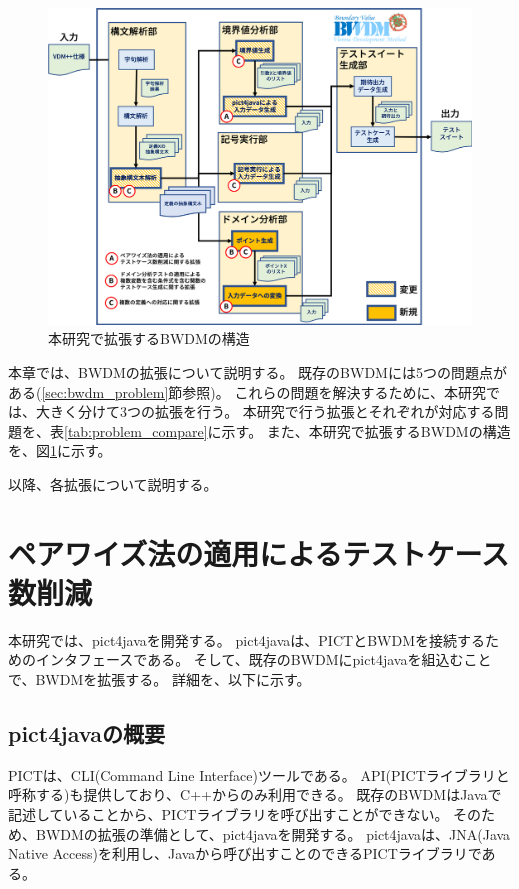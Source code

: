 \documentclass[uplatex, report, a4j, 10pt]{jsbook}
\newcommand{\tool}{BWDM}
\begin{document}
\begin{figure}[tp]
  \centering
  \includegraphics[keepaspectratio, width=160mm]{figs/extended_bwdm_structure}
  \caption{本研究で拡張するBWDMの構造}
  \label{fig:extendedBwdmStructure}
\end{figure}

本章では、\tool{}の拡張について説明する。
既存のBWDMには5つの問題点がある(\ref{sec:bwdm_problem}節参照)。
これらの問題を解決するために、本研究では、大きく分けて3つの拡張を行う。
本研究で行う拡張とそれぞれが対応する問題を、表\ref{tab:problem_compare}に示す。
また、本研究で拡張するBWDMの構造を、図\ref{fig:extendedBwdmStructure}に示す。

以降、各拡張について説明する。

\section{ペアワイズ法の適用によるテストケース数削減}\label{sec:extendPairwise}
本研究では、pict4javaを開発する。
pict4javaは、PICTとBWDMを接続するためのインタフェースである。
そして、既存のBWDMにpict4javaを組込むことで、BWDMを拡張する。
詳細を、以下に示す。

\subsection{pict4javaの概要}\label{sec:create_pict4java}
PICTは、CLI(Command Line Interface)ツールである。
API(PICTライブラリと呼称する)も提供しており、C++からのみ利用できる。
既存のBWDMはJavaで記述していることから、PICTライブラリを呼び出すことができない。
そのため、BWDMの拡張の準備として、pict4javaを開発する。
pict4javaは、JNA(Java Native Access)\cite{jna}を利用し、Javaから呼び出すことのできるPICTライブラリである。
\end{document}
